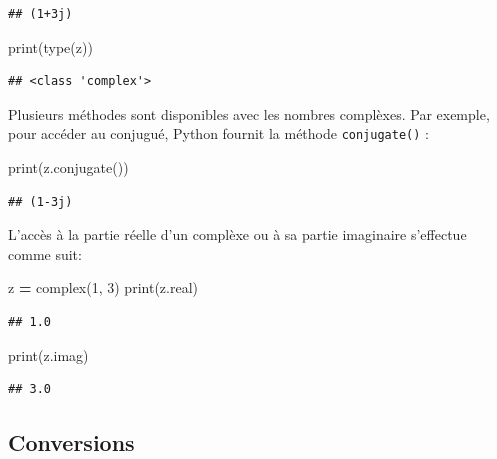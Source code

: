 \documentclass[
  12pt,
]{book}
\newenvironment{Shaded}{\begin{snugshade}}{\end{snugshade}}
\newcommand{\BuiltInTok}[1]{#1}
\newcommand{\DecValTok}[1]{\textcolor[rgb]{0.00,0.00,0.81}{#1}}
\newcommand{\NormalTok}[1]{#1}
\newcommand{\OperatorTok}[1]{\textcolor[rgb]{0.81,0.36,0.00}{\textbf{#1}}}
\numberwithin{equation}{section}
\numberwithin{countremarque}{section}
\begin{document}
\begin{lstlisting}
## (1+3j)
\end{lstlisting}

\begin{Shaded}
\begin{Highlighting}[]
\BuiltInTok{print}\NormalTok{(}\BuiltInTok{type}\NormalTok{(z))}
\end{Highlighting}
\end{Shaded}

\begin{lstlisting}
## <class 'complex'>
\end{lstlisting}

Plusieurs méthodes sont disponibles avec les nombres complèxes. Par exemple, pour accéder au conjugué, Python fournit la méthode \texttt{conjugate()} :

\begin{Shaded}
\begin{Highlighting}[]
\BuiltInTok{print}\NormalTok{(z.conjugate())}
\end{Highlighting}
\end{Shaded}

\begin{lstlisting}
## (1-3j)
\end{lstlisting}

L'accès à la partie réelle d'un complèxe ou à sa partie imaginaire s'effectue comme suit:

\begin{Shaded}
\begin{Highlighting}[]
\NormalTok{z }\OperatorTok{=} \BuiltInTok{complex}\NormalTok{(}\DecValTok{1}\NormalTok{, }\DecValTok{3}\NormalTok{)}
\BuiltInTok{print}\NormalTok{(z.real)}
\end{Highlighting}
\end{Shaded}

\begin{lstlisting}
## 1.0
\end{lstlisting}

\begin{Shaded}
\begin{Highlighting}[]
\BuiltInTok{print}\NormalTok{(z.imag)}
\end{Highlighting}
\end{Shaded}

\begin{lstlisting}
## 3.0
\end{lstlisting}

\subsection{Conversions}\label{conversions}
\end{document}
